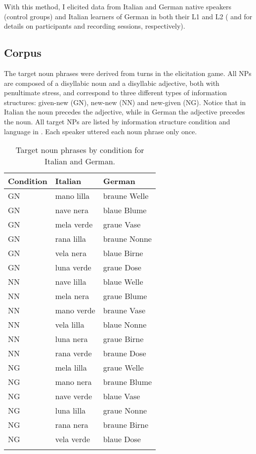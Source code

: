 With this method, I elicited data from Italian and German native speakers (control groups) and Italian learners of German in both their L1 and L2 ( and  for details on participants and recording sessions, respectively).

\subsection{Corpus}
\label{sec:2.2.2}
The target noun phrases were derived from turns in the elicitation game. All NPs are composed of a disyllabic noun and a disyllabic adjective, both with penultimate stress, and correspond to three different types of information structures: given-new (GN), new-new (NN) and new-given (NG). Notice that in Italian the noun precedes the adjective, while in German the adjective precedes the noun. All target NPs are listed by information structure condition and language in . Each speaker uttered each noun phrase only once.

\begin{table}
\begin{tabular}{lll}
\lsptoprule
Condition & Italian & German\\
\midrule
GN & mano lilla & braune Welle\\
GN & nave nera & blaue Blume\\
GN & mela verde & graue Vase\\
GN & rana lilla & braune Nonne\\
GN & vela nera & blaue Birne\\
GN & luna verde & graue Dose\\
NN & nave lilla & blaue Welle\\
NN & mela nera & graue Blume\\
NN & mano verde & braune Vase\\
NN & vela lilla & blaue Nonne\\
NN & luna nera & graue Birne\\
NN & rana verde & braune Dose\\
NG & mela lilla & graue Welle\\
NG & mano nera & braune Blume\\
NG & nave verde & blaue Vase\\
NG & luna lilla & graue Nonne\\
NG & rana nera & braune Birne\\
NG & vela verde & blaue Dose\\
\lspbottomrule
\end{tabular}
\caption{Target noun phrases by condition for Italian and German.}
\label{tab:2.1}
\end{table}


